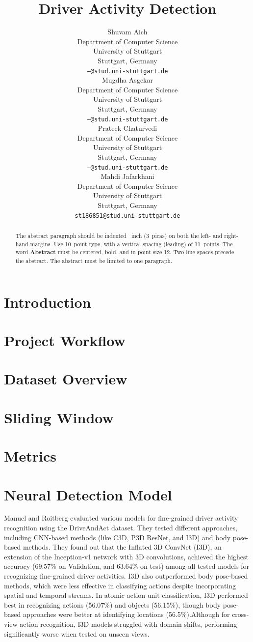 \documentclass{article}
\title{Driver Activity Detection}
\author{%
  Shuvam Aich \\
  Department of Computer Science\\
  University of Stuttgart\\
  Stuttgart, Germany \\
  \texttt{---@stud.uni-stuttgart.de} \\
  \And
  Mugdha Asgekar \\
  Department of Computer Science\\
  University of Stuttgart\\
  Stuttgart, Germany \\
  \texttt{---@stud.uni-stuttgart.de} \\
  \AND
  Prateek Chaturvedi \\
  Department of Computer Science\\
  University of Stuttgart\\
  Stuttgart, Germany \\
  \texttt{---@stud.uni-stuttgart.de} \\
  \And
  Mahdi Jafarkhani \\
  Department of Computer Science\\
  University of Stuttgart\\
  Stuttgart, Germany \\
  \texttt{st186851@stud.uni-stuttgart.de} \\
}
\begin{document}
\maketitle


\begin{abstract}
  The abstract paragraph should be indented ~inch (3~picas) on
  both the left- and right-hand margins. Use 10~point type, with a vertical
  spacing (leading) of 11~points.  The word \textbf{Abstract} must be centered,
  bold, and in point size 12. Two line spaces precede the abstract. The abstract
  must be limited to one paragraph.
\end{abstract}


\section{Introduction}

\section{Project Workflow}

\section{Dataset Overview}

\section{Sliding Window}

\section{Metrics}

\section{Neural Detection Model}
Manuel and Roitberg \cite{drive_and_act_2019_iccv} evaluated various models for fine-grained driver activity recognition using the DriveAndAct dataset. They tested different approaches, including CNN-based methods (like C3D, P3D ResNet, and I3D) and body pose-based methods. They found out that the Inflated 3D ConvNet (I3D), an extension of the Inception-v1 network with 3D convolutions, achieved the highest accuracy (69.57\% on Validation, and 63.64\% on test) among all tested models for recognizing fine-grained driver activities.
I3D also outperformed body pose-based methods, which were less effective in classifying actions despite incorporating spatial and temporal streams.
In atomic action unit classification, I3D performed best in recognizing actions (56.07\%) and objects (56.15\%), though body pose-based approaches were better at identifying locations (56.5\%).Although for cross-view action recognition, I3D models struggled with domain shifts, performing significantly worse when tested on unseen views.
\end{document}
